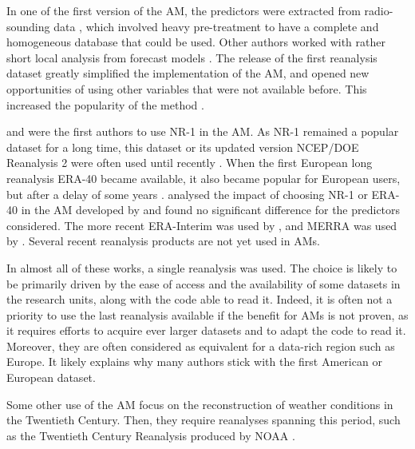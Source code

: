 \documentclass{ametsoc}
\begin{document}
In one of the first version of the AM, the predictors were extracted from radio-sounding data \citep{Duband1981}, which involved heavy pre-treatment to have a complete and homogeneous database that could be used. Other authors worked with rather short local analysis from forecast models \cite[for example][]{Kruizinga1983, VandenDool1989}. The release of the first reanalysis dataset \citep[NCEP/NCAR Reanalysis I, NR-1,][]{Kalnay1996, Kistler2001} greatly simplified the implementation of the AM, and opened new opportunities of using other variables that were not available before. This increased the popularity of the method \citep{Timbal2008a}.

\citet{Timbal2003} and \citet{Bontron2004} were the first authors to use NR-1 in the AM. As NR-1 remained a popular dataset for a long time, this dataset or its updated version NCEP/DOE Reanalysis 2 \citep[NR-2,][]{Kanamitsu2002} were often used until recently \citep{Wetterhall2005a, Gangopadhyay2005, Altava-Ortiz2006, Barrera2007, Cannon2007, Matulla2007, Bliefernicht2007, Maurer2008, Wu2012, Marty2012, Teng2012, Horton2012, Yiou2014}. When the first European long reanalysis ERA-40 \citep{Uppala2005} became available, it also became popular for European users, but after a delay of some years \citep {Willems2011b, JakobThemessl2011a, BenDaoud2011, Turco2011a, Franke2011, Pascual2012b, Schenk2012, Ribalaygua2013a, Osca2013, Radanovics2013, Martin2014b, Chardon2014, BenDaoud2016}. \citet{BenDaoud2009} analysed the impact of choosing NR-1 or ERA-40 in the AM developed by \citet{Bontron2004} and found no significant difference for the predictors considered. The more recent ERA-Interim \citep[ERA-INT, ][]{Dee2011a} was used by \cite{Raynaud2016b}, and MERRA \citep{Rienecker2011} was used by \citet{Vanvyve2015}. Several recent reanalysis products are not yet used in AMs.

In almost all of these works, a single reanalysis was used. The choice is likely to be primarily driven by the ease of access and the availability of some datasets in the research units, along with the code able to read it. Indeed, it is often not a priority to use the last reanalysis available if the benefit for AMs is not proven, as it requires efforts to acquire ever larger datasets and to adapt the code to read it. Moreover, they are often considered as equivalent for a data-rich region such as Europe. It likely explains why many authors stick with the first American or European dataset.

Some other use of the AM focus on the reconstruction of weather conditions in the Twentieth Century. Then, they require reanalyses spanning this period, such as the Twentieth Century Reanalysis \citep[20CR][]{Compo2011} produced by NOAA \citep[for example,][]{Kuentz2015, Caillouet2016, Brigode2016}. 
\end{document}
